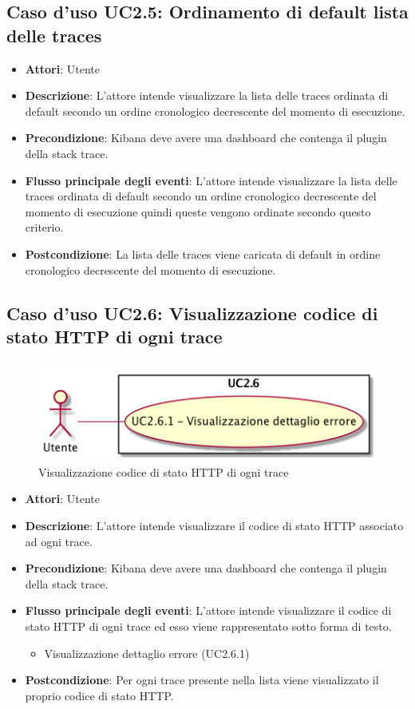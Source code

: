 \subsection{Caso d'uso UC2.5: Ordinamento di default lista delle traces}
\begin{itemize}
\item \textbf{Attori}: Utente
\item \textbf{Descrizione}: L'attore intende visualizzare la lista delle traces ordinata di default secondo un ordine cronologico decrescente del momento di esecuzione.
\item \textbf{Precondizione}: Kibana deve avere una dashboard che contenga il plugin della stack trace.
\item \textbf{Flusso principale degli eventi}: L'attore intende visualizzare la lista delle traces ordinata di default secondo un ordine cronologico decrescente del momento di esecuzione quindi queste vengono ordinate secondo questo criterio.
\item \textbf{Postcondizione}: La lista delle traces viene caricata di default in ordine cronologico decrescente del momento di esecuzione.
\end{itemize}
\subsection{Caso d'uso UC2.6: Visualizzazione codice di stato HTTP di ogni trace}
\begin{figure} [H]
\centering
\includegraphics[scale=0.45]{./UC/UC2-6.png}
\caption{Visualizzazione codice di stato HTTP di ogni trace}\label{}
\end{figure}
\begin{itemize}
\item \textbf{Attori}: Utente
\item \textbf{Descrizione}: L'attore intende visualizzare il codice di stato HTTP associato ad ogni trace.
\item \textbf{Precondizione}: Kibana deve avere una dashboard che contenga il plugin della stack trace.
\item \textbf{Flusso principale degli eventi}: L'attore intende visualizzare il codice di stato HTTP di ogni trace ed esso viene rappresentato sotto forma di testo.
\begin{itemize}
\item Visualizzazione dettaglio errore (UC2.6.1)
\end{itemize}
\item \textbf{Postcondizione}: Per ogni trace presente nella lista viene visualizzato il proprio codice di stato HTTP.
\end{itemize}
